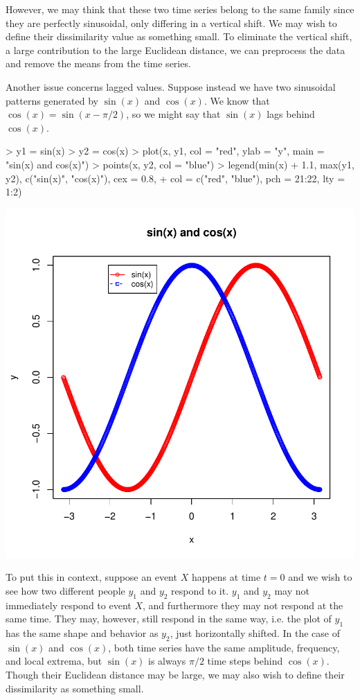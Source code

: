 \documentclass{article}
\begin{document}
However, we may think that these two time series belong to the same family since
they are perfectly sinusoidal, only differing in a vertical shift.  We may wish 
to define their dissimilarity value as something small.  To eliminate the 
vertical shift, a large contribution to the large Euclidean distance, we can 
preprocess the data and remove the means from the time series.  

Another issue concerns lagged values.  Suppose instead we have two sinusoidal 
patterns generated by $\sin(x)$ and $\cos(x)$.  We know that 
$\cos(x) = \sin(x - \pi/2)$, so we might say that $\sin(x)$ lags behind $\cos(x)$.  

\begin{Schunk}
\begin{Sinput}
> y1 = sin(x)
> y2 = cos(x)
> plot(x, y1, col = "red", ylab = "y", main = "sin(x) and cos(x)")
> points(x, y2, col = "blue")
> legend(min(x) + 1.1, max(y1, y2), c("sin(x)", "cos(x)"), cex = 0.8, 
+     col = c("red", "blue"), pch = 21:22, lty = 1:2)
\end{Sinput}
\end{Schunk}
\includegraphics{tsclust-004}

To put this in context, suppose an event $X$ happens at time $t = 0$ and we wish
to see how two different people $y_1$ and $y_2$ respond to it.  $y_1$ and $y_2$
may not immediately respond to event $X$, and furthermore they may not respond 
at the same time.  They may, however, still respond in the same way, i.e. the 
plot of $y_1$ has the same shape and behavior as $y_2$, just horizontally shifted. 
In the case of $\sin(x)$ and $\cos(x)$, both time series have the same amplitude, 
frequency, and local extrema, but $\sin(x)$ is always $\pi/2$ time steps behind 
$\cos(x)$.  Though their Euclidean distance may be large, we may also wish to
define their dissimilarity as something small.
\end{document}
